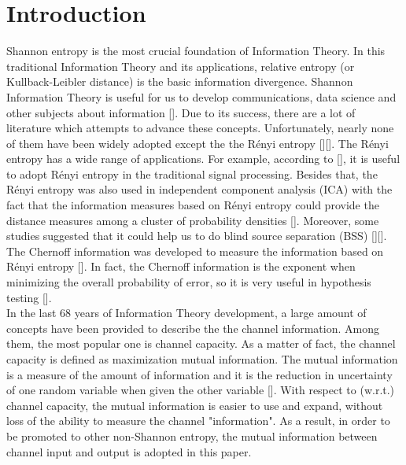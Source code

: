 \documentclass[conference]{IEEEtran}
\begin{document}
\section{Introduction}
Shannon entropy is the most crucial foundation of Information Theory. In this traditional Information Theory and its applications, relative entropy (or Kullback-Leibler distance) is the basic information divergence. Shannon Information Theory is useful for us to develop communications, data science and other subjects about information [\cite{verdu1998fifty}]. Due to its success, there are a lot of literature which attempts to advance these concepts. Unfortunately, nearly none of them have been widely adopted except the the R{\'{e}}nyi entropy [\cite{rrnyi1961measures}][\cite{van2014renyi}]. The R{\'{e}}nyi entropy has a wide range of applications. For example, according to [\cite{principe2000information}], it is useful to adopt R{\'{e}}nyi entropy in the traditional signal processing. Besides that, the R{\'{e}}nyi entropy was also used in independent component analysis (ICA) with the fact that the information measures based on R{\'{e}}nyi entropy could provide the distance measures among a cluster of probability densities [\cite{bao2003renyi}]. Moreover, some studies suggested that it could help us to do blind source separation (BSS) [\cite{hild2001blind}][\cite{hild2006analysis}]. The Chernoff information was developed to measure the information based on R{\'{e}}nyi entropy [\cite{van2014renyi}]. In fact, the Chernoff information is the exponent when minimizing the overall probability of error, so it is very useful in hypothesis testing [\cite{Elements}].\\ %


In the last 68 years of Information Theory development, a large amount of concepts have been provided to describe the the channel information. Among them, the most popular one is channel capacity. As a matter of fact, the channel capacity is defined as maximization mutual information. The mutual information is a measure of the amount of information and it is the reduction in uncertainty of one random variable when given the other variable [\cite{Elements}]. With respect to (w.r.t.) channel capacity, the mutual information is easier to use and expand, without loss of the ability to measure the channel "information". As a result, in order to be promoted to other non-Shannon entropy, the mutual information between channel input and output is adopted in this paper.\\ %
\end{document}
